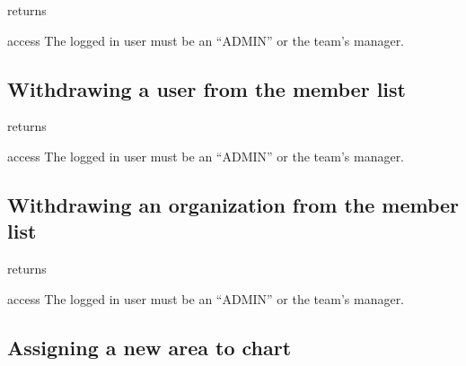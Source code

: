 \begin{apidata}{returns}
  \begin{datalist}
  \end{datalist}
\end{apidata}
\begin{apidata}{access}
The logged in user must be an ``ADMIN'' or the team's manager.
\end{apidata}


\subsection{Withdrawing a user from the member list}

\begin{apidata}{returns}
  \begin{datalist}
  \end{datalist}
\end{apidata}
\begin{apidata}{access}
The logged in user must be an ``ADMIN'' or the team's manager.
\end{apidata}



\subsection{Withdrawing an organization from the member list}

\begin{apidata}{returns}
  \begin{datalist}
  \end{datalist}
\end{apidata}
\begin{apidata}{access}
The logged in user must be an ``ADMIN'' or the team's manager.
\end{apidata}


\subsection{Assigning a new area to chart}


